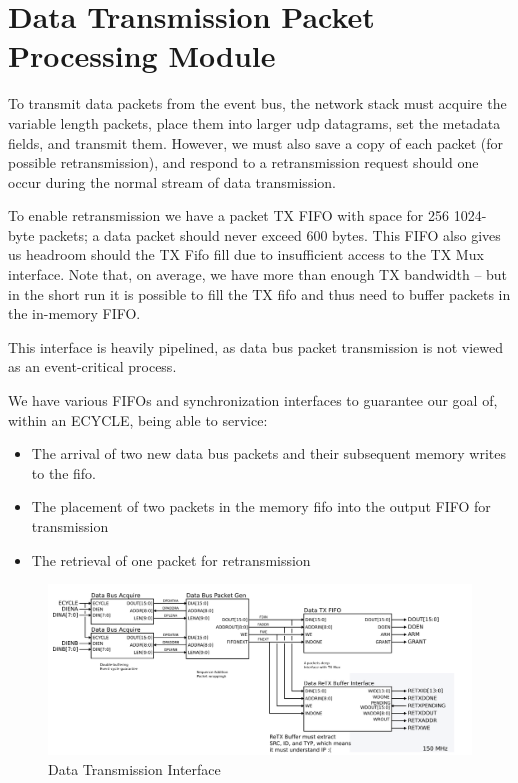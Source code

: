 \section{Data Transmission Packet Processing Module}

To transmit data packets from the event bus, the network stack must
acquire the variable length packets, place them into larger udp
datagrams, set the metadata fields, and transmit them. However, we
must also save a copy of each packet (for possible retransmission),
and respond to a retransmission request should one occur during the
normal stream of data transmission.

To enable retransmission we have a packet TX FIFO with space for 256
1024-byte packets; a data packet should never exceed 600 bytes. This
FIFO also gives us headroom should the TX Fifo fill due to
insufficient access to the TX Mux interface. Note that, on average, we
have more than enough TX bandwidth -- but in the short run it is
possible to fill the TX fifo and thus need to buffer packets in the
in-memory FIFO.

This interface is heavily pipelined, as data bus packet transmission
is not viewed as an event-critical process.

We have various FIFOs and synchronization interfaces to guarantee our
goal of, within an ECYCLE, being able to service:

\begin{itemize}
\item The arrival of two new data bus packets and their subsequent
  memory writes to the fifo.
\item The placement of two packets in the memory fifo into the output
  FIFO for transmission
\item The retrieval of one packet for retransmission
\end{itemize}

 \begin{figure}
\begin{centering}
\includegraphics[scale=0.7]{data.svg}
\end{centering}
\caption{Data Transmission Interface}
\label{data}
\end{figure}


